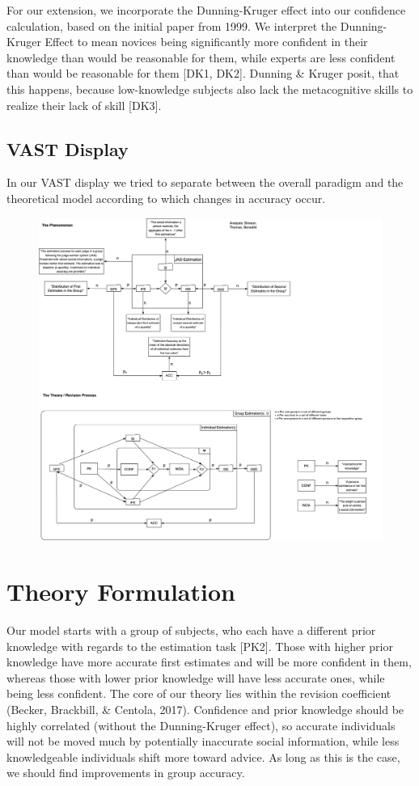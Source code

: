 \documentclass[
  man,floatsintext]{apa6}
\begin{document}
For our extension, we incorporate the Dunning-Kruger effect into our confidence calculation, based on the initial paper from 1999. We interpret the Dunning-Kruger Effect to mean novices being significantly more confident in their knowledge than would be reasonable for them, while experts are less confident than would be reasonable for them {[}DK1, DK2{]}. Dunning \& Kruger posit, that this happens, because low-knowledge subjects also lack the metacognitive skills to realize their lack of skill {[}DK3{]}.

\hypertarget{vast-display}{%
\subsection{VAST Display}\label{vast-display}}

In our VAST display we tried to separate between the overall paradigm and the theoretical model according to which changes in accuracy occur.

\begin{figure}[H]
\includegraphics[width=0.9\linewidth]{VAST_Image} \caption{ }\label{fig:unnamed-chunk-1}
\end{figure}

\hypertarget{theory-formulation}{%
\section{Theory Formulation}\label{theory-formulation}}

Our model starts with a group of subjects, who each have a different prior knowledge with regards to the estimation task {[}PK2{]}. Those with higher prior knowledge have more accurate first estimates and will be more confident in them, whereas those with lower prior knowledge will have less accurate ones, while being less confident. The core of our theory lies within the revision coefficient (Becker, Brackbill, \& Centola, 2017). Confidence and prior knowledge should be highly correlated (without the Dunning-Kruger effect), so accurate individuals will not be moved much by potentially inaccurate social information, while less knowledgeable individuals shift more toward advice. As long as this is the case, we should find improvements in group accuracy.
\end{document}
